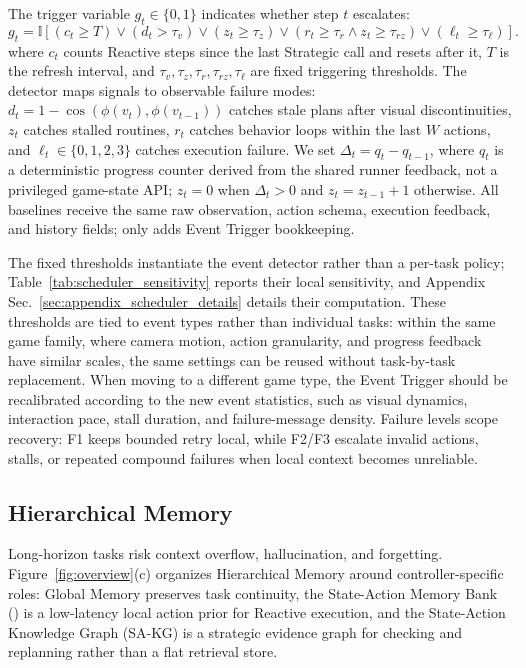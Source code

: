 The trigger variable $g_t \in \{0,1\}$ indicates whether step $t$ escalates:
\vspace{-0.35em}
\begin{equation}
\label{eq:scheduler_routing}
g_t=\mathbb{I}\!\left[(c_t\ge T)\vee(d_t>\tau_v)\vee(z_t\ge\tau_z)\vee(r_t\ge\tau_r\wedge z_t\ge\tau_{rz})\vee(\ell_t\ge\tau_\ell)\right].
\end{equation}
where $c_t$ counts Reactive steps since the last Strategic call and resets after
it, $T$ is the refresh interval, and
$\tau_v,\tau_z,\tau_r,\tau_{rz},\tau_\ell$ are fixed triggering thresholds.
The detector maps signals to observable failure modes: $d_t=1-\cos(\phi(v_t),\phi(v_{t-1}))$
catches stale plans after visual discontinuities, $z_t$ catches stalled routines,
$r_t$ catches behavior loops within the last $W$ actions, and
$\ell_t\in\{0,1,2,3\}$ catches execution failure. We set
$\Delta_t=q_t-q_{t-1}$, where $q_t$ is a deterministic progress counter derived
from the shared \stardojo{} runner feedback, not a privileged game-state API;
$z_t=0$ when $\Delta_t>0$ and $z_t=z_{t-1}+1$ otherwise. All baselines receive
the same raw observation, action schema, execution feedback, and history fields;
\method{} only adds Event Trigger bookkeeping.

The fixed thresholds instantiate the event detector rather than a per-task
policy; Table~\mbox{\ref{tab:scheduler_sensitivity}} reports their local
sensitivity, and Appendix Sec.~\mbox{\ref{sec:appendix_scheduler_details}}
details their computation. These thresholds are tied to event types rather than
individual tasks: within the same game family, where camera motion, action
granularity, and progress feedback have similar scales, the same settings can be
reused without task-by-task replacement. When moving to a different game type,
the Event Trigger should be recalibrated according to the new event statistics,
such as visual dynamics, interaction pace, stall duration, and failure-message
density.
Failure levels scope recovery: F1 keeps bounded retry local, while F2/F3
escalate invalid actions, stalls, or repeated compound failures when local
context becomes unreliable.

\FloatBarrier
\subsection{Hierarchical Memory}
\label{subsec:memory}

Long-horizon tasks risk context overflow, hallucination, and forgetting.
Figure~\mbox{\ref{fig:overview}}(c) organizes Hierarchical Memory around
controller-specific roles: Global Memory preserves task continuity, the
State-Action Memory Bank (\samb{}) is a low-latency local action prior for
Reactive execution, and the State-Action Knowledge Graph (SA-KG) is a strategic
evidence graph for checking and replanning rather than a flat retrieval store.

